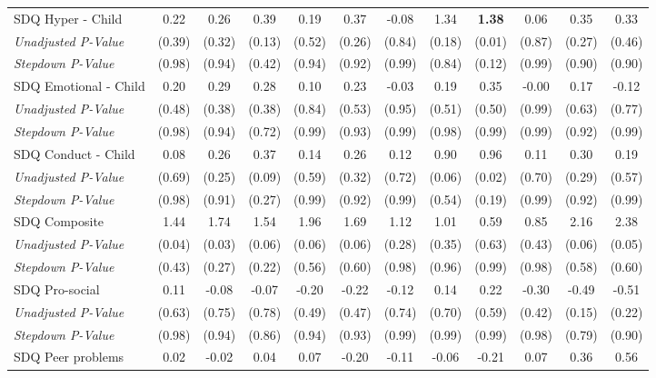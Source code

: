 \begin{tabular}{l c c c c c c c c c c c}
SDQ Hyper - Child & 0.22 & 0.26 & 0.39 & 0.19 & 0.37 & -0.08 & 1.34 & \textbf{ 1.38 } & 0.06 & 0.35 & 0.33 \\
\quad \textit{Unadjusted P-Value} & (0.39) & (0.32) & (0.13) & (0.52) & (0.26) & (0.84) & (0.18) & (0.01) & (0.87) & (0.27) & (0.46) \\
\quad \textit{Stepdown P-Value} & (0.98) & (0.94) & (0.42) & (0.94) & (0.92) & (0.99) & (0.84) & (0.12) & (0.99) & (0.90) & (0.90) \\
SDQ Emotional - Child & 0.20 & 0.29 & 0.28 & 0.10 & 0.23 & -0.03 & 0.19 & 0.35 & -0.00 & 0.17 & -0.12 \\
\quad \textit{Unadjusted P-Value} & (0.48) & (0.38) & (0.38) & (0.84) & (0.53) & (0.95) & (0.51) & (0.50) & (0.99) & (0.63) & (0.77) \\
\quad \textit{Stepdown P-Value} & (0.98) & (0.94) & (0.72) & (0.99) & (0.93) & (0.99) & (0.98) & (0.99) & (0.99) & (0.92) & (0.99) \\
SDQ Conduct - Child & 0.08 & 0.26 & 0.37 & 0.14 & 0.26 & 0.12 & 0.90 & 0.96 & 0.11 & 0.30 & 0.19 \\
\quad \textit{Unadjusted P-Value} & (0.69) & (0.25) & (0.09) & (0.59) & (0.32) & (0.72) & (0.06) & (0.02) & (0.70) & (0.29) & (0.57) \\
\quad \textit{Stepdown P-Value} & (0.98) & (0.91) & (0.27) & (0.99) & (0.92) & (0.99) & (0.54) & (0.19) & (0.99) & (0.92) & (0.99) \\
SDQ Composite & 1.44 & 1.74 & 1.54 & 1.96 & 1.69 & 1.12 & 1.01 & 0.59 & 0.85 & 2.16 & 2.38 \\
\quad \textit{Unadjusted P-Value} & (0.04) & (0.03) & (0.06) & (0.06) & (0.06) & (0.28) & (0.35) & (0.63) & (0.43) & (0.06) & (0.05) \\
\quad \textit{Stepdown P-Value} & (0.43) & (0.27) & (0.22) & (0.56) & (0.60) & (0.98) & (0.96) & (0.99) & (0.98) & (0.58) & (0.60) \\
SDQ Pro-social & 0.11 & -0.08 & -0.07 & -0.20 & -0.22 & -0.12 & 0.14 & 0.22 & -0.30 & -0.49 & -0.51 \\
\quad \textit{Unadjusted P-Value} & (0.63) & (0.75) & (0.78) & (0.49) & (0.47) & (0.74) & (0.70) & (0.59) & (0.42) & (0.15) & (0.22) \\
\quad \textit{Stepdown P-Value} & (0.98) & (0.94) & (0.86) & (0.94) & (0.93) & (0.99) & (0.99) & (0.99) & (0.98) & (0.79) & (0.90) \\
SDQ Peer problems & 0.02 & -0.02 & 0.04 & 0.07 & -0.20 & -0.11 & -0.06 & -0.21 & 0.07 & 0.36 & 0.56 \\

\end{tabular}
